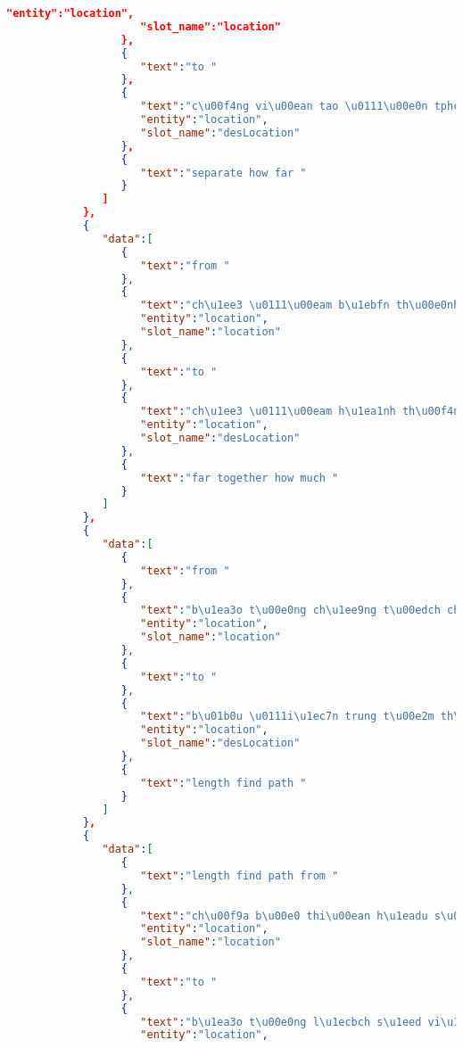 \begin{lstlisting}[language=json,firstnumber=1]
                     "entity":"location",
                     "slot_name":"location"
                  },
                  {
                     "text":"to "
                  },
                  {
                     "text":"c\u00f4ng vi\u00ean tao \u0111\u00e0n tphcm ",
                     "entity":"location",
                     "slot_name":"desLocation"
                  },
                  {
                     "text":"separate how far "
                  }
               ]
            },
            {
               "data":[
                  {
                     "text":"from "
                  },
                  {
                     "text":"ch\u1ee3 \u0111\u00eam b\u1ebfn th\u00e0nh s\u00e0i g\u00f2n ",
                     "entity":"location",
                     "slot_name":"location"
                  },
                  {
                     "text":"to "
                  },
                  {
                     "text":"ch\u1ee3 \u0111\u00eam h\u1ea1nh th\u00f4ng t\u00e2y ",
                     "entity":"location",
                     "slot_name":"desLocation"
                  },
                  {
                     "text":"far together how much "
                  }
               ]
            },
            {
               "data":[
                  {
                     "text":"from "
                  },
                  {
                     "text":"b\u1ea3o t\u00e0ng ch\u1ee9ng t\u00edch chi\u1ebfn tranh th\u00e0nh ph\u1ed1 h\u1ed3 ch\u00ed minh ",
                     "entity":"location",
                     "slot_name":"location"
                  },
                  {
                     "text":"to "
                  },
                  {
                     "text":"b\u01b0u \u0111i\u1ec7n trung t\u00e2m th\u00e0nh ph\u1ed1 h\u1ed3 ch\u00ed minh ",
                     "entity":"location",
                     "slot_name":"desLocation"
                  },
                  {
                     "text":"length find path "
                  }
               ]
            },
            {
               "data":[
                  {
                     "text":"length find path from "
                  },
                  {
                     "text":"ch\u00f9a b\u00e0 thi\u00ean h\u1eadu s\u00e0i g\u00f2n ",
                     "entity":"location",
                     "slot_name":"location"
                  },
                  {
                     "text":"to "
                  },
                  {
                     "text":"b\u1ea3o t\u00e0ng l\u1ecbch s\u1eed vi\u1ec7t nam ",
                     "entity":"location",

\end{lstlisting}
